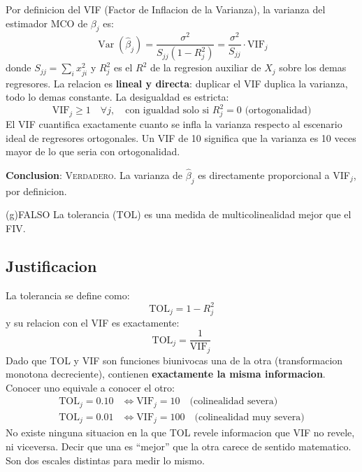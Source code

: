 \documentclass[12pt, letterpaper]{article}
\theoremstyle{remark}
\newcommand{\Var}{\operatorname{Var}}
\begin{document}
Por definicion del VIF (Factor de Inflacion de la Varianza), la varianza del
estimador MCO de $\beta_j$ es:
\begin{equation}
  \Var(\hat\beta_j)
    = \frac{\sigma^2}{S_{jj}(1-R_j^2)}
    = \frac{\sigma^2}{S_{jj}} \cdot \text{VIF}_j
  \label{eq:var_vif_def}
\end{equation}
donde $S_{jj} = \sum_i x_{ji}^2$ y $R_j^2$ es el $R^2$ de la regresion
auxiliar de $X_j$ sobre los demas regresores. La relacion es \textbf{lineal
y directa}: duplicar el VIF duplica la varianza, todo lo demas constante.
La desigualdad es estricta:
\begin{equation}
  \text{VIF}_j \geq 1 \quad \forall j, \quad
  \text{con igualdad solo si } R_j^2 = 0 \text{ (ortogonalidad)}
  \label{eq:VIF_geq1}
\end{equation}
El VIF cuantifica exactamente cuanto se infla la varianza respecto al
escenario ideal de regresores ortogonales. Un VIF de 10 significa que la
varianza es 10 veces mayor de lo que seria con ortogonalidad.

\textbf{Conclusion}: \textsc{Verdadero}. La varianza de $\hat\beta_j$ es
directamente proporcional a VIF$_j$, por definicion.

\bigskip

\begin{verdict}{(g)}{FALSO}
  La tolerancia (TOL) es una medida de multicolinealidad mejor que el FIV.
\end{verdict}

\subsection*{Justificacion}

La tolerancia se define como:
\begin{equation}
  \text{TOL}_j = 1 - R_j^2
  \label{eq:TOL}
\end{equation}
y su relacion con el VIF es exactamente:
\begin{equation}
  \text{TOL}_j = \frac{1}{\text{VIF}_j}
  \label{eq:TOL_VIF}
\end{equation}
Dado que TOL y VIF son funciones biunivocas una de la otra
(transformacion monotona decreciente), contienen \textbf{exactamente la
misma informacion}. Conocer uno equivale a conocer el otro:
\begin{align}
  \text{TOL}_j = 0.10 &\iff \text{VIF}_j = 10 \quad \text{(colinealidad severa)}\\
  \text{TOL}_j = 0.01 &\iff \text{VIF}_j = 100 \quad \text{(colinealidad muy severa)}
\end{align}
No existe ninguna situacion en la que TOL revele informacion que VIF no
revele, ni viceversa. Decir que una es ``mejor'' que la otra carece de
sentido matematico. Son dos escales distintas para medir lo mismo.
\end{document}
